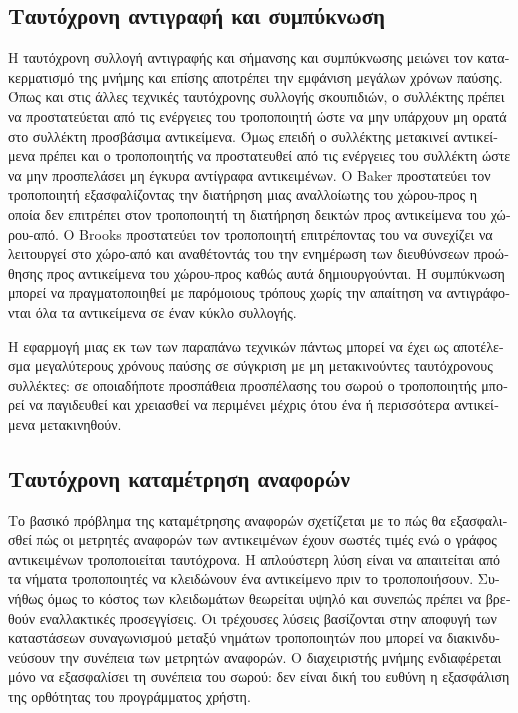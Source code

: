 \begin{greek}
\subsection{Ταυτόχρονη αντιγραφή και συμπύκνωση}
Η ταυτόχρονη συλλογή αντιγραφής και σήμανσης και συμπύκνωσης
μειώνει τον κατακερματισμό της μνήμης και επίσης αποτρέπει
την εμφάνιση μεγάλων χρόνων παύσης. Όπως και στις άλλες
τεχνικές ταυτόχρονης συλλογής σκουπιδιών, ο συλλέκτης πρέπει να προστατεύεται
από τις ενέργειες του τροποποιητή ώστε να μην υπάρχουν
μη ορατά στο συλλέκτη προσβάσιμα αντικείμενα. Όμως επειδή
ο συλλέκτης μετακινεί αντικείμενα πρέπει και ο τροποποιητής
να προστατευθεί από τις ενέργειες του συλλέκτη ώστε να μην
προσπελάσει μη έγκυρα αντίγραφα αντικειμένων. Ο Baker
\cite{DBLP:journals/cacm/Baker78} προστατεύει τον τροποποιητή
εξασφαλίζοντας την διατήρηση μιας αναλλοίωτης του χώρου-προς
η οποία δεν επιτρέπει στον τροποποιητή τη διατήρηση δεικτών
προς αντικείμενα του χώρου-από. Ο Brooks \cite{DBLP:conf/lfp/Brooks84}
προστατεύει τον τροποποιητή επιτρέποντας του να συνεχίζει
να λειτουργεί στο χώρο-από και αναθέτοντάς του την ενημέρωση
των διευθύνσεων προώθησης προς αντικείμενα του χώρου-προς
καθώς αυτά δημιουργούνται. 
Η συμπύκνωση μπορεί να πραγματοποιηθεί με παρόμοιους τρόπους
χωρίς την απαίτηση να αντιγράφονται όλα τα αντικείμενα σε
έναν κύκλο συλλογής.

Η εφαρμογή μιας εκ των των παραπάνω τεχνικών πάντως μπορεί να
έχει ως αποτέλεσμα μεγαλύτερους χρόνους παύσης σε σύγκριση
με μη μετακινούντες ταυτόχρονους συλλέκτες: σε οποιαδήποτε
προσπάθεια προσπέλασης του σωρού ο τροποποιητής μπορεί να
παγιδευθεί και χρειασθεί να περιμένει μέχρις ότου ένα ή
περισσότερα αντικείμενα μετακινηθούν.

\subsection{Ταυτόχρονη καταμέτρηση αναφορών}
Το βασικό πρόβλημα της καταμέτρησης αναφορών σχετίζεται με το
πώς θα εξασφαλισθεί πώς οι μετρητές αναφορών των αντικειμένων
έχουν σωστές τιμές ενώ ο γράφος αντικειμένων τροποποιείται
ταυτόχρονα. Η απλούστερη λύση είναι να απαιτείται από τα νήματα
τροποποιητές να κλειδώνουν ένα αντικείμενο πριν το τροποποιήσουν.
Συνήθως όμως το κόστος των κλειδωμάτων θεωρείται υψηλό και συνεπώς
πρέπει να βρεθούν εναλλακτικές προσεγγίσεις. Οι τρέχουσες λύσεις
βασίζονται στην αποφυγή των καταστάσεων συναγωνισμού μεταξύ
νημάτων τροποποιητών που μπορεί να διακινδυνεύσουν την συνέπεια
των μετρητών αναφορών. Ο διαχειριστής μνήμης ενδιαφέρεται μόνο
να εξασφαλίσει τη συνέπεια του σωρού: δεν είναι δική του ευθύνη
η εξασφάλιση της ορθότητας του προγράμματος χρήστη.


\end{greek}
